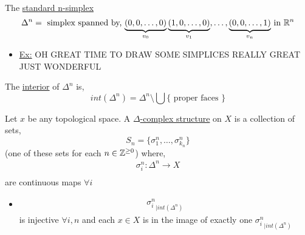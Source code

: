 \documentclass[../notes.tex]{subfiles}
\begin{document}
\begin{definition}
    The \underline{standard n-simplex}
    \[
        \Delta^n= \text{ simplex spanned by, $
            \underbrace{(0,0,\dots,0)}_{v_0}
            \underbrace{(1,0,\dots,0)}_{v_1},\dots,
            \underbrace{(0,0,\dots,1)}_{v_n}$ in $\mathbb{R}^n$}
    \]
\end{definition}
\begin{itemize}
    \item \underline{Ex:} OH GREAT TIME TO DRAW SOME SIMPLICES REALLY GREAT JUST WONDERFUL
\end{itemize}
\begin{definition}
    The \underline{interior} of $\Delta^n$ is,
    \[
        int(\Delta^n)=\Delta^n\setminus \bigcup \{\text{ proper faces }\}
    \]
\end{definition}
\begin{definition}
    Let $x$ be any topological space. A \underline{$\Delta$-complex structure} on $X$
    is a collection of sets,
    \[
        S_n = \{\sigma_1^n,\dots,\sigma_{k_n}^n\}
    \]
    (one of these sets for each $n\in \mathbb{Z}^{\geq 0}$) where,
    \begin{align*}
        \sigma_i^n:\Delta^n\rightarrow X\\
    \end{align*}
    are continuous maps $\forall i$
    \begin{itemize}
        \item 
            \begin{align*}
                {\sigma_i^n}_{|int(\Delta^n)}
            \end{align*}
            is injective $\forall i,n$ and each $x\in X$ is in the image of exactly one
            ${\sigma_i^n}_{|int(\Delta^n)}$
    \end{itemize}
\end{definition}
\end{document}
